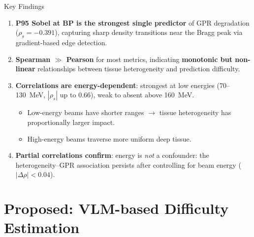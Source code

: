 \documentclass[aspectratio=169, 10pt]{beamer}
\begin{document}
\begin{frame}{Key Findings}
  \begin{enumerate}
    \item \textbf{P95 Sobel at BP is the strongest single predictor} of GPR
          degradation ($\rho_s = -0.391$), capturing sharp density
          transitions near the Bragg peak via gradient-based edge detection.

    \vspace{6pt}
    \item \textbf{Spearman $\gg$ Pearson} for most metrics, indicating
          \textbf{monotonic but non-linear} relationships between tissue
          heterogeneity and prediction difficulty.

    \vspace{6pt}
    \item \textbf{Correlations are energy-dependent}: strongest at low
          energies (70--\SI{130}{MeV}, $|\rho_s|$ up to $0.66$), weak to
          absent above \SI{160}{MeV}.
          \begin{itemize}
            \item Low-energy beams have shorter ranges $\rightarrow$ tissue
                  heterogeneity has proportionally larger impact.
            \item High-energy beams traverse more uniform deep tissue.
          \end{itemize}

    \vspace{6pt}
    \item \textbf{Partial correlations confirm}: energy is \emph{not} a
          confounder: the heterogeneity--GPR association persists after
          controlling for beam energy ($|\Delta\rho| < 0.04$).
  \end{enumerate}
\end{frame}

\section{Proposed: VLM-based Difficulty Estimation}
\end{document}
